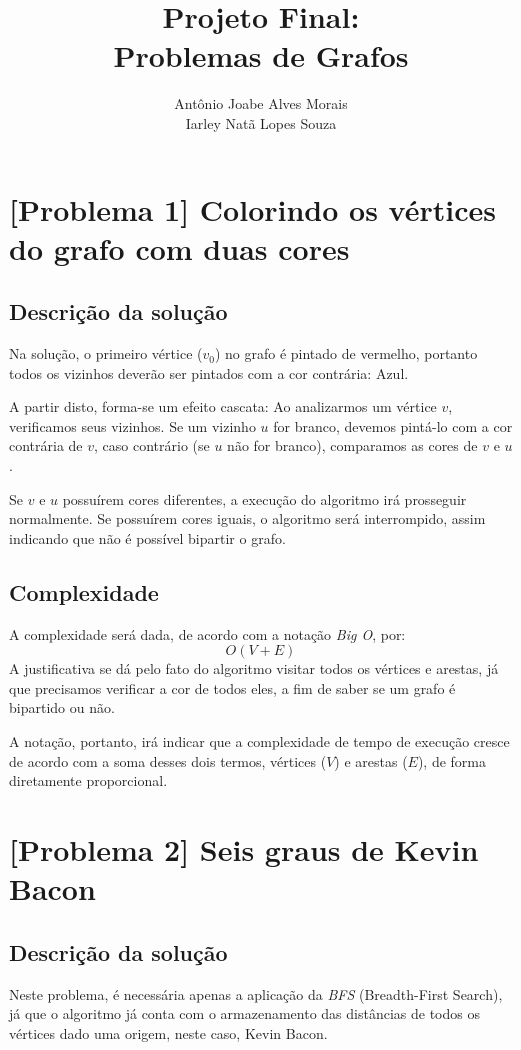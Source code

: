 \documentclass[12pt, letterpaper]{article}
\title{\textbf{Projeto Final: \\ Problemas de Grafos}}
\date{}
\author{Antônio Joabe Alves Morais \\ Iarley Natã Lopes Souza}
\begin{document}
    \maketitle

    \section{[Problema 1] Colorindo os vértices do grafo com duas cores}
        \subsection{Descrição da solução}
            Na solução, o primeiro vértice ($v_0$) no grafo é pintado de vermelho, portanto todos os vizinhos deverão ser pintados com a cor contrária: Azul.

            A partir disto, forma-se um efeito cascata: Ao analizarmos um vértice $v$, verificamos seus vizinhos. Se um vizinho $u$ for branco, devemos pintá-lo com a cor contrária de $v$, caso contrário (se $u$ não for branco), comparamos as cores de $v$ e $u$.

            Se $v$ e $u$ possuírem cores diferentes, a execução do algoritmo irá prosseguir normalmente. Se possuírem cores iguais, o algoritmo será interrompido, assim indicando que não é possível bipartir o grafo.

        \subsection{Complexidade}
            A complexidade será dada, de acordo com a notação \emph{Big O}, por:
            $$ O(V + E) $$
            A justificativa se dá pelo fato do algoritmo visitar todos os vértices e arestas, já que precisamos verificar a cor de todos eles, a fim de saber se um grafo é bipartido ou não.

            A notação, portanto, irá indicar que a complexidade de tempo de execução cresce de acordo com a soma desses dois termos, vértices ($V$) e arestas ($E$), de forma diretamente proporcional.

    \section{[Problema 2] Seis graus de Kevin Bacon}
        \subsection{Descrição da solução}
            Neste problema, é necessária apenas a aplicação da \emph{BFS} (Breadth-First Search), já que o algoritmo já conta com o armazenamento das distâncias de todos os vértices dado uma origem, neste caso, Kevin Bacon.
\end{document}
